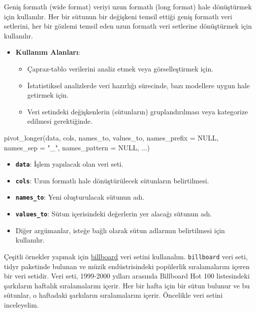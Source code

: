 \documentclass[
  letterpaper,
  DIV=11,
  numbers=noendperiod]{scrreprt}
\newenvironment{Shaded}{\begin{snugshade}}{\end{snugshade}}
\newcommand{\AttributeTok}[1]{\textcolor[rgb]{0.40,0.45,0.13}{#1}}
\newcommand{\ConstantTok}[1]{\textcolor[rgb]{0.56,0.35,0.01}{#1}}
\newcommand{\FunctionTok}[1]{\textcolor[rgb]{0.28,0.35,0.67}{#1}}
\newcommand{\NormalTok}[1]{\textcolor[rgb]{0.00,0.23,0.31}{#1}}
\newcommand{\StringTok}[1]{\textcolor[rgb]{0.13,0.47,0.30}{#1}}
\begin{document}

Geniş formatlı (wide format) veriyi uzun formatlı (long format) hale
dönüştürmek için kullanılır. Her bir sütunun bir değişkeni temsil ettiği
geniş formatlı veri setlerini, her bir gözlemi temsil eden uzun formatlı
veri setlerine dönüştürmek için kullanılır.

\begin{itemize}
\item
  \textbf{Kullanım Alanları}:

  \begin{itemize}
  \item
    Çapraz-tablo verilerini analiz etmek veya görselleştirmek için.
  \item
    İstatistiksel analizlerde veri hazırlığı sürecinde, bazı modellere
    uygun hale getirmek için.
  \item
    Veri setindeki değişkenlerin (sütunların) gruplandırılması veya
    kategorize edilmesi gerektiğinde.
  \end{itemize}
\end{itemize}

\begin{Shaded}
\begin{Highlighting}[]
\FunctionTok{pivot\_longer}\NormalTok{(data, cols, names\_to, values\_to, }\AttributeTok{names\_prefix =} \ConstantTok{NULL}\NormalTok{, }\AttributeTok{names\_sep =} \StringTok{"\_"}\NormalTok{, }\AttributeTok{names\_pattern =} \ConstantTok{NULL}\NormalTok{, ...)}
\end{Highlighting}
\end{Shaded}

\begin{itemize}
\item
  \textbf{\texttt{data}}: İşlem yapılacak olan veri seti.
\item
  \textbf{\texttt{cols}}: Uzun formatlı hale dönüştürülecek sütunların
  belirtilmesi.
\item
  \textbf{\texttt{names\_to}}: Yeni oluşturulacak sütunun adı.
\item
  \textbf{\texttt{values\_to}}: Sütun içerisindeki değerlerin yer
  alacağı sütunun adı.
\item
  Diğer argümanlar, isteğe bağlı olarak sütun adlarının belirtilmesi
  için kullanılır.
\end{itemize}

Çeşitli örnekler yapmak için
\href{https://waxy.org/2008/05/the_whitburn_project/}{billboard} veri
setini kullanalım. \texttt{billboard} veri seti, tidyr paketinde bulunan
ve müzik endüstrisindeki popülerlik sıralamalarını içeren bir veri
setidir. Veri seti, 1999-2000 yılları arasında Billboard Hot 100
listesindeki şarkıların haftalık sıralamalarını içerir. Her bir hafta
için bir sütun bulunur ve bu sütunlar, o haftadaki şarkıların
sıralamalarını içerir. Öncelikle veri setini inceleyelim.
\end{document}
